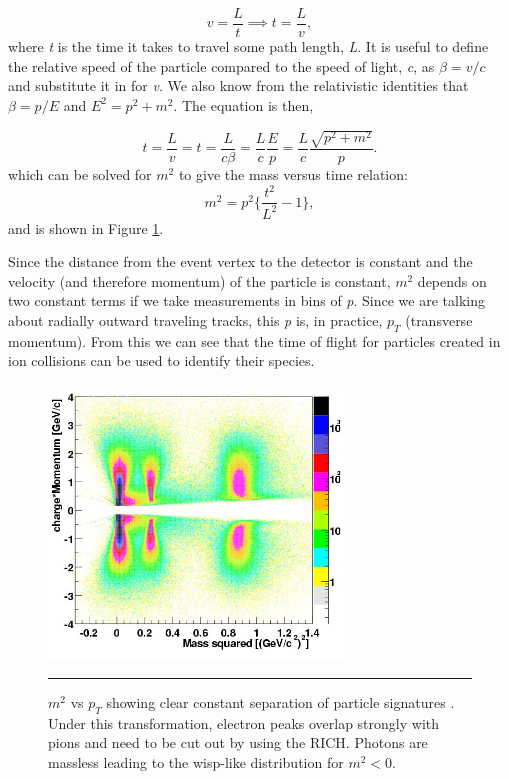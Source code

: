 \begin{equation}
v=\frac{L}{t} \implies t=\frac{L}{v},
\end{equation}
where \textit{t} is the time it takes to travel some path length, \textit{L}. It is useful to define the relative speed of the particle compared to the speed of light, \textit{c}, as $\beta = v/c$ and substitute it in for \textit{v}. We also know from the relativistic identities that $\beta = p/E$ and $E^{2} = p^{2} + m^{2}$. The equation is then, 

\begin{equation} \label{eqn:qmomentum}
t=\frac{L}{v} = t=\frac{L}{c\beta} = \frac{L}{c} \frac{E}{p} = \frac{L}{c} \frac{\sqrt{p^{2} + m^{2}}}{p}.
\end{equation}
which can be solved for $m^{2}$ to give the mass versus time relation:
\begin{equation} \label{eqn:m2tof}
m^{2} = p^{2} \bigg\{ \frac{t^{2}}{L^{2}} -1 \bigg\},
\end{equation}
and is shown in Figure \ref{fig:m2tofvspt}.

Since the distance from the event vertex to the detector is constant and the velocity (and therefore momentum) of the particle is constant, $m^{2}$ depends on two constant terms if we take measurements in bins of \textit{p}. Since we are talking about radially outward traveling tracks, this \textit{p} is, in practice, $p_{T}$ (transverse momentum). From this we can see that the time of flight for particles created in ion collisions can be used to identify their species.
\begin{figure}[htbp!]
  \centering
    \includegraphics[width=0.7\textwidth]{Figures/m2tofvspt.jpg}
    \rule{35em}{0.5pt}
  \caption[$m^{2}$ vs $p_{T}$ showing clear constant separation of particle signatures.]{$m^{2}$ vs $p_{T}$ showing clear constant separation of particle signatures \citep{tofchargemom}. Under this transformation, electron peaks overlap strongly with pions and need to be cut out by using the RICH. Photons are massless leading to the wisp-like distribution for $m^2<0$.}
  \label{fig:m2tofvspt}
\end{figure}

\pagebreak
\pagebreak
